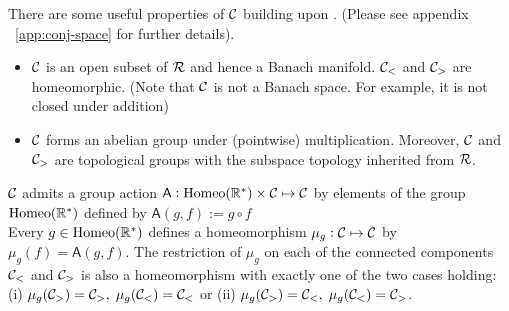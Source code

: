 There are some useful properties of $\mathcal{C}$ building upon \cite{mishraConjGen2023}. (Please see appendix ~\ref{app:conj-space} for further details).
\begin{itemize}
    \item $\mathcal{C}$ is an open subset of $\mathcal{R}$ and hence a Banach manifold. $\mathcal{C}_{<}$ and $\mathcal{C}_{>}$ are homeomorphic. (Note that $\mathcal{C}$ is not a Banach space. For example, it is not closed under addition)
    \item $\mathcal{C}$ forms an abelian group under (pointwise) multiplication. Moreover, $\mathcal{C}$ and $\mathcal{C}_{>}$ are topological groups with the subspace topology inherited from $\mathcal{R}$. 
\end{itemize}

\begin{lemma}
    \label{lemma:homeo-action}
    $\mathcal{C}$ admits a group action $\mathsf{A}: \text{Homeo}(\mathbb{R}^*)\times\mathcal{C}\mapsto\mathcal{C}$ by elements of the group $\text{Homeo}(\mathbb{R}^*)$ defined by $\mathsf{A}(g,f) := g\circ f$\\
    Every $g\in\text{Homeo}(\mathbb{R}^*)$ defines a homeomorphism $\mu_g : \mathcal{C}\mapsto\mathcal{C}$ by $\mu_g(f) = \mathsf{A}(g,f)$. The restriction of $\mu_g$ on each of the connected components $\mathcal{C}_{<}$ and $\mathcal{C}_{>}$ is also a homeomorphism 
    with exactly one of the two cases holding: (i) $\mu_g(\mathcal{C}_{>}) = \mathcal{C}_{>},\; \mu_g(\mathcal{C}_{<}) = \mathcal{C}_{<}$ or (ii) $\mu_g(\mathcal{C}_{>}) = \mathcal{C}_{<},\; \mu_g(\mathcal{C}_{<}) = \mathcal{C}_{>}$.
\end{lemma}

